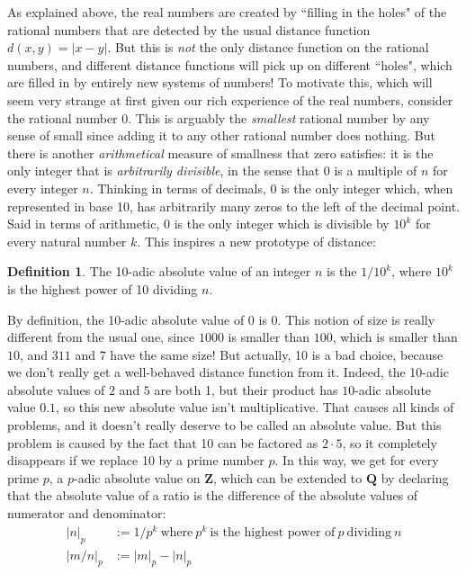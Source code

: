 \documentclass[11pt]{amsart}
\newcommand*{\Z}{\ensuremath{\mathbf{Z}}}
\newcommand*{\Q}{\ensuremath{\mathbf{Q}}}
\theoremstyle{plain}
\theoremstyle{definition}
\newtheorem{definition}[theorem]{Definition}
\theoremstyle{remark}
\numberwithin{theorem}{section}
\numberwithin{equation}{section}
\begin{document}
As explained above, the real numbers are created by ``filling in the holes" of the rational numbers that are detected by the
usual distance function $d(x,y)=|x-y|$.  But this is {\em not} the only distance function on the rational numbers, and
different distance functions will pick up on different ``holes", which are filled in by entirely new systems of numbers!
To motivate this, which will seem very strange at first given our rich experience of the real numbers, consider the rational
number 0.  This is arguably the {\em smallest} rational number by any sense of small since adding it to any other rational number
does nothing.  But there is another {\em arithmetical} measure of smallness that zero satisfies: it is the only integer
that is {\em arbitrarily divisible}, in the sense that $0$ is a multiple of $n$ for every integer $n$.  Thinking in terms of 
decimals, $0$ is the only integer which, when represented in base 10, has arbitrarily many zeros to the left of the decimal point.
Said in terms of arithmetic, 0 is the only integer which is divisible by $10^k$ for every natural number $k$.
This inspires a new prototype of distance:

\begin{definition}
	The 10-adic absolute value of an integer $n$ is the $1/10^k$, where $10^k$ is the highest power of
	10 dividing $n$.
\end{definition}  

By definition, the 10-adic absolute value of $0$ is 0.  This notion of size 
is really different from the usual one, since $1000$ is smaller than $100$, which is smaller than $10$,
and $311$ and $7$ have the same size!  But actually, 10 is a bad choice, because we don't really get a well-behaved
distance function from it.  Indeed, the 10-adic absolute values of $2$ and $5$ are both 1, but their product has 
$10$-adic absolute value $0.1$, so this new absolute value isn't multiplicative.  That causes all kinds of problems,
and it doesn't really deserve to be called an absolute value.  But this problem is caused by the fact that 10 can be factored as $2\cdot 5$,
so it completely disappears if we replace 10 by a prime number $p$.  In this way, we get for every prime $p$,
a $p$-adic absolute value on $\Z$, which can be extended to $\Q$ by declaring that the absolute value of
a ratio is the difference of the absolute values of numerator and denominator:
\begin{align*}
	|n|_p &:= 1/p^k\ \text{where}\ p^k\ \text{is the highest power of}\ p\ \text{dividing}\ n \\
	|m/n|_p &:= |m|_p - |n|_p
\end{align*}
\end{document}
